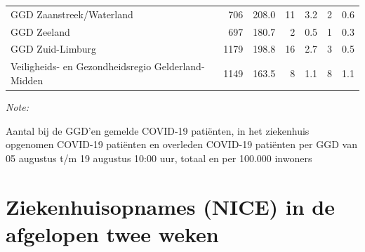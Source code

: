 \documentclass[
  english,
  man,floatsintext]{apa6}
\begin{document}
\begin{table}
\begin{threeparttable}
\begin{tabular}{lrrrrrr}
GGD Zaanstreek/Waterland & 706 & 208.0 & 11 & 3.2 & 2 & 0.6\\
GGD Zeeland & 697 & 180.7 & 2 & 0.5 & 1 & 0.3\\
GGD Zuid-Limburg & 1179 & 198.8 & 16 & 2.7 & 3 & 0.5\\
Veiligheids- en Gezondheidsregio Gelderland-Midden & 1149 & 163.5 & 8 & 1.1 & 8 & 1.1\\
\bottomrule
\end{tabular}
\begin{tablenotes}
\item \textit{Note: } 
\item Aantal bij de GGD’en gemelde COVID-19 patiënten, in het ziekenhuis opgenomen COVID-19 patiënten en overleden COVID-19 patiënten per GGD van 05 augustus t/m 19 augustus 10:00 uur, totaal en per 100.000 inwoners
\end{tablenotes}
\end{threeparttable}
\endgroup{}
\end{table}

\newpage

\hypertarget{ziekenhuisopnames-nice-in-de-afgelopen-twee-weken}{%
\section{Ziekenhuisopnames (NICE) in de afgelopen twee weken}\label{ziekenhuisopnames-nice-in-de-afgelopen-twee-weken}}
\end{document}

